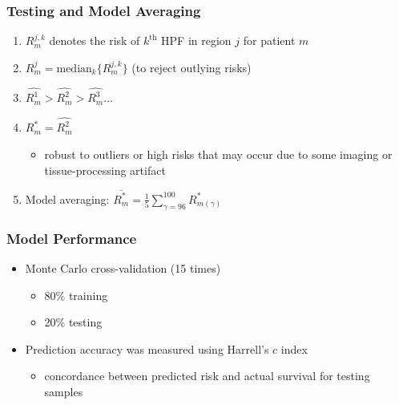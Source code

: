 \message{ !name(presentation.tex)}\documentclass[usenames,dvipsnames]{beamer}
\begin{document}
\begin{frame}
  \frametitle{Testing and Model Averaging}
  \begin{enumerate}
    \item $R_{m}^{j,k}$ denotes the risk of $k^{{\text{th}}}$ HPF in region $j$
    for patient $m$
    \item $R_{m}^{j}=\text{median}_{k}{\{R_{m}^{j,k}\}}$ (to reject outlying
    risks)
    \item $\widehat{R_{m}^{1}}>\widehat{R_{m}^{2}}>\widehat{R_{m}^{3}} \ldots$
    \item $R_{m}^{*}=\widehat{R_{m}^{2}}$
    \begin{itemize}
      \item robust to outliers or high risks that may occur due to some imaging or tissue-processing artifact
    \end{itemize}
    \item Model averaging: $\overline{R_{m}^{*}}=\frac{1}{5} \sum_{\gamma=96}^{100} R_{m(\gamma)}^{*}$
  \end{enumerate}
\end{frame}
\begin{frame}
  \frametitle{Model Performance}
  \begin{itemize}
    \item Monte Carlo cross-validation (15 times)
    \begin{itemize}
      \item 80\% training
      \item 20\% testing
    \end{itemize}
    \item Prediction accuracy was measured using Harrell's $c$ index
    \begin{itemize}
      \item concordance between predicted risk and actual survival for testing samples
    \end{itemize}
  \end{itemize}
\end{frame}
\end{document}
